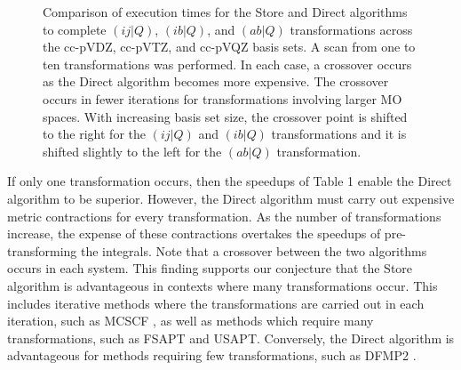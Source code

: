 \begin{figure}[H]
  \hfill
  \caption{Comparison of execution times for the Store and Direct algorithms to complete $(ij|Q)$, $(ib|Q)$, and $(ab|Q)$ transformations
across the cc-pVDZ, cc-pVTZ, and cc-pVQZ basis sets. A scan from one to ten transformations was performed. In each case, a crossover
occurs as the Direct algorithm becomes more expensive. The crossover occurs in fewer iterations for transformations involving larger MO spaces.
With increasing basis set size, the crossover point is shifted to the right for the $(ij|Q)$ and $(ib|Q)$
transformations and it is shifted slightly to the left for the $(ab|Q)$ transformation.}
\end{figure}

If only one transformation occurs, then the speedups of Table 1 enable the Direct algorithm to be superior. 
However, the Direct algorithm must carry out expensive metric contractions for every transformation. As the
number of transformations increase, the expense of these contractions
overtakes the speedups of pre-transforming the integrals. Note that a crossover between the two algorithms occurs in each system. 
This finding supports our conjecture that the Store algorithm is advantageous in contexts where many transformations occur. 
This includes iterative methods where the transformations
are carried out in each iteration, such as MCSCF \cite{}, as well as methods which require many transformations, such as FSAPT and 
USAPT. Conversely, the Direct algorithm is advantageous for methods
requiring few transformations, such as DFMP2 \cite{}.

